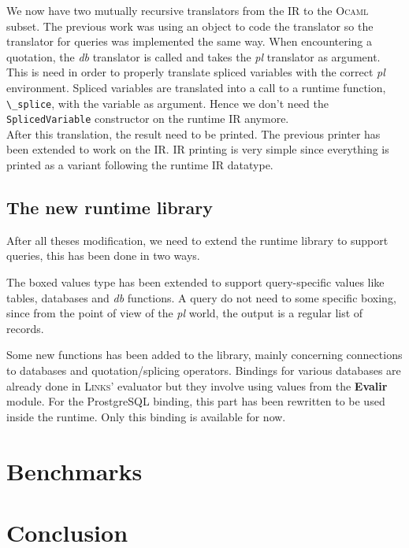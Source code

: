 \documentclass[11pt]{article}
\newcommand\mysc[1]{{\rmfamily\textsc{#1}}\xspace}
\newcommand\links{\mysc{Links}}
\newcommand\ocaml{\mysc{Ocaml}}
\newcommand\effect[1]{{\em #1}}
\newcommand\ocamlc[1]{\lstinline[language={[Objective]Caml},basicstyle=\ttfamily\normalsize]{#1}}
\newcommand\module[1]{{\bf #1}}
\begin{document}
We now have two mutually recursive translators from the IR to the \ocaml subset. The previous work was using an object to code the translator so the translator for queries was implemented the same way. When encountering a quotation, the \effect{db} translator is called and takes the \effect{pl} translator as argument. This is need in order to properly translate spliced variables with the correct \effect{pl} environment.
Spliced variables are translated into a call to a runtime function, \ocamlc{\_splice}, with the variable as argument. Hence we don't need the \ocamlc{SplicedVariable} constructor on the runtime IR anymore.\\

After this translation, the result need to be printed. The previous printer has been extended to work on the IR. IR printing is very simple since everything is printed as a variant following the runtime IR datatype.

\subsection{The new runtime library}

After all theses modification, we need to extend the runtime library to support queries, this has been done in two ways. 

The boxed values type has been extended to support query-specific values like tables, databases and \effect{db} functions. A query do not need to some specific boxing, since from the point of view of the \effect{pl} world, the output is a regular list of records.

Some new functions has been added to the library, mainly concerning connections to databases and quotation/splicing operators. Bindings for various databases are already done in \links' evaluator but they involve using values from the \module{Evalir} module. For the ProstgreSQL binding, this part has been rewritten to be used inside the runtime. Only this binding is available for now.

\section{Benchmarks}

\section{Conclusion}
\end{document}

